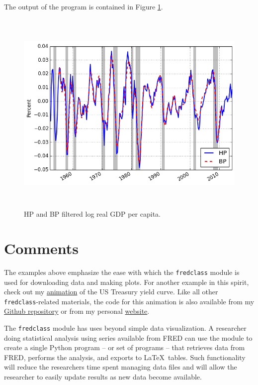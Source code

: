 \documentclass[11pt,fleqn]{article}
\newcommand{\ttt}{\texttt}
\begin{document}
\noindent The output of the program is contained in Figure \ref{fig:3}.

\begin{figure}[h] \caption{\label{fig:3} HP and BP filtered log real GDP per capita.}
\begin{center}
\includegraphics[height = 10cm]{fig_fredclass_example3.png}
\end{center}
\end{figure}


\section{Comments}

The examples above emphasize the ease with which the \ttt{fredclass} module is used for downloading data and making plots. For another example in this spirit, check out my \href{http://youtu.be/34bIQGrndao}{animation} of the US Treasury yield curve. Like all other \ttt{fredclass}-related materials, the code for this animation is also available from my \href{https://github.com/letsgoexploring/fredclass}{Github repository} or from my personal \href{http://www.briancjenkins.com/code/fredclass.html}{website}.

The \ttt{fredclass} module has uses beyond simple data visualization. A researcher doing statistical analysis using series available from FRED can use the module to create a single Python program -- or set of programs -- that retrieves data from FRED, performs the analysis, and exports to \LaTeX \ tables. Such functionality will reduce the researchers time spent managing data files and will allow the researcher to easily update results as new data become available.
\end{document}
